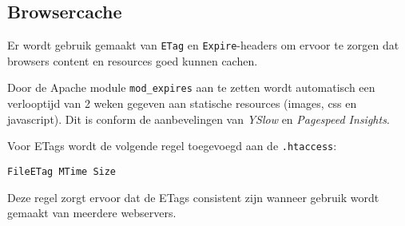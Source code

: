 \subsection{Browsercache}

Er wordt gebruik gemaakt van \texttt{ETag} en \texttt{Expire}-headers om ervoor te zorgen dat browsers content en resources goed kunnen cachen.

Door de Apache module \texttt{mod\_expires} aan te zetten wordt automatisch een verlooptijd van 2 weken gegeven aan statische resources (images, css en javascript). Dit is conform de aanbevelingen van \emph{YSlow} en \emph{Pagespeed Insights}.

Voor ETags wordt de volgende regel toegevoegd aan de \texttt{.htaccess}:
\begin{verbatim}
FileETag MTime Size
\end{verbatim}
Deze regel zorgt ervoor dat de ETags consistent zijn wanneer gebruik wordt gemaakt van meerdere webservers.